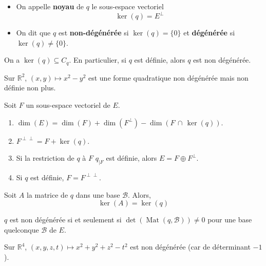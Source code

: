   \begin{definition}
    \begin{itemize}
      \item On appelle \textbf{noyau} de $q$ le sous-espace vectoriel
      \[ \ker(q) = E^{\perp} \]
      \item On dit que $q$ est \textbf{non-dégénérée} si $\ker(q) = \{ 0 \}$ et \textbf{dégénérée} si $\ker(q) \neq \{ 0 \}$.
    \end{itemize}
  \end{definition}

  \begin{proposition}
    On a $\ker(q) \subseteq C_q$. En particulier, si $q$ est définie, alors $q$ est non dégénérée.
  \end{proposition}

  \begin{example}
    Sur $\mathbb{R}^2$, $(x, y) \mapsto x^2 - y^2$ est une forme quadratique non dégénérée mais non définie non plus.
  \end{example}

  \begin{proposition}
    Soit $F$ un sous-espace vectoriel de $E$.
    \begin{enumerate}[label={\bfseries(\roman*)}]
      \item $\dim(E) = \dim(F) + \dim(F^\perp) - \dim(F \, \cap \, \ker(q))$.
      \item $F^{\perp\perp} = F + \ker(q)$.
      \item Si la restriction de $q$ à $F$ $q_{|F}$ est définie, alors $E = F \oplus F^{\perp}$.
      \item Si $q$ est définie, $F = F^{\perp\perp}$.
    \end{enumerate}
  \end{proposition}

  \begin{proposition}
    Soit $A$ la matrice de $q$ dans une base $\mathcal{B}$. Alors,
    \[ \ker(A) = \ker(q) \]
  \end{proposition}


  \begin{corollary}
    $q$ est non dégénérée si et seulement si $\det(\operatorname{Mat}(q, \mathcal{B})) \neq 0$ pour une base quelconque $\mathcal{B}$ de $E$.
  \end{corollary}

  \begin{example}
    Sur $\mathbb{R}^4$, $(x, y, z, t) \mapsto x^2 + y^2 + z^2 - t^2$ est non dégénérée (car de déterminant $-1$).
  \end{example}

